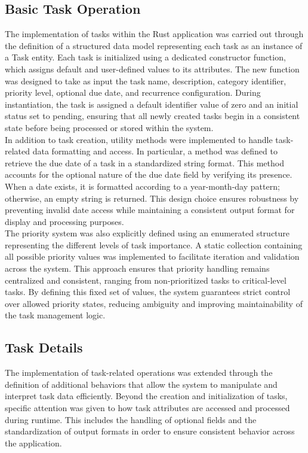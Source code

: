 \documentclass{article}
\begin{document}
\subsection{Basic Task Operation}
The implementation of tasks within the Rust application was carried out through the definition of a structured data model representing each task as an instance of a Task entity. Each task is initialized using a dedicated constructor function, which assigns default and user-defined values to its attributes. The new function was designed to take as input the task name, description, category identifier, priority level, optional due date, and recurrence configuration. During instantiation, the task is assigned a default identifier value of zero and an initial status set to pending, ensuring that all newly created tasks begin in a consistent state before being processed or stored within the system.
\\

In addition to task creation, utility methods were implemented to handle task-related data formatting and access. In particular, a method was defined to retrieve the due date of a task in a standardized string format. This method accounts for the optional nature of the due date field by verifying its presence. When a date exists, it is formatted according to a year-month-day pattern; otherwise, an empty string is returned. This design choice ensures robustness by preventing invalid date access while maintaining a consistent output format for display and processing purposes.
\\

The priority system was also explicitly defined using an enumerated structure representing the different levels of task importance. A static collection containing all possible priority values was implemented to facilitate iteration and validation across the system. This approach ensures that priority handling remains centralized and consistent, ranging from non-prioritized tasks to critical-level tasks. By defining this fixed set of values, the system guarantees strict control over allowed priority states, reducing ambiguity and improving maintainability of the task management logic.



\subsection{Task Details}
The implementation of task-related operations was extended through the definition of additional behaviors that allow the system to manipulate and interpret task data efficiently. Beyond the creation and initialization of tasks, specific attention was given to how task attributes are accessed and processed during runtime. This includes the handling of optional fields and the standardization of output formats in order to ensure consistent behavior across the application.
\\
\end{document}

